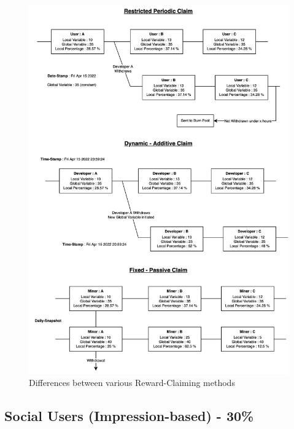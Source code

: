 \documentclass[letterpaper,11pt]{article}
\begin{document}
\begin{figure}
\begin{center}
\includegraphics[width=15cm]{claim-rewards}
\caption{Differences between various Reward-Claiming methods}
\end{center}
\end{figure}





\subsection{\textbf{Social Users (Impression-based) - 30\%}}
\end{document}
